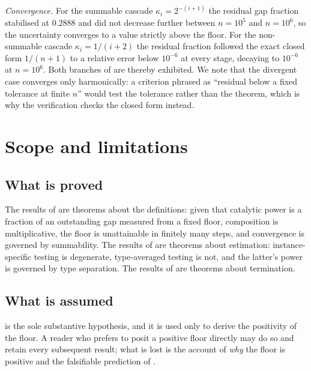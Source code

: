 \documentclass[11pt,a4paper]{article}
\theoremstyle{thmstyle}
\theoremstyle{definition}
\theoremstyle{remark}
\newcommand{\kap}{\kappa}
\begin{document}
\emph{Convergence.} For the summable cascade $\kap_i=2^{-(i+1)}$ the residual
gap fraction stabilised at $0.2888$ and did not decrease further between
$n=10^5$ and $n=10^6$, so the uncertainty converges to a value strictly above
the floor. For the non-summable cascade $\kap_i=1/(i+2)$ the residual
fraction followed the exact closed form $1/(n+1)$ to a relative error below
$10^{-6}$ at every stage, decaying to $10^{-6}$ at $n=10^6$. Both branches of
 are thereby exhibited. We note that the divergent case
converges only harmonically: a criterion phrased as ``residual below a fixed
tolerance at finite $n$'' would test the tolerance rather than the theorem,
which is why the verification checks the closed form instead.

\section{Scope and limitations}
\label{sec:scope}

\subsection{What is proved}

The results of  are theorems about
the definitions: given that catalytic power is a fraction of an outstanding
gap measured from a fixed floor, composition is multiplicative, the floor is
unattainable in finitely many steps, and convergence is governed by
summability. The results of
 are theorems about estimation:
instance-specific testing is degenerate, type-averaged testing is not, and
the latter's power is governed by type separation. The results of
 are theorems about termination.

\subsection{What is assumed}

 is the sole substantive hypothesis, and it is used only to
derive the positivity of the floor. A reader who prefers to posit a positive
floor directly may do so and retain every subsequent result; what is lost is
the account of \emph{why} the floor is positive and the falsifiable
prediction of .
\end{document}
